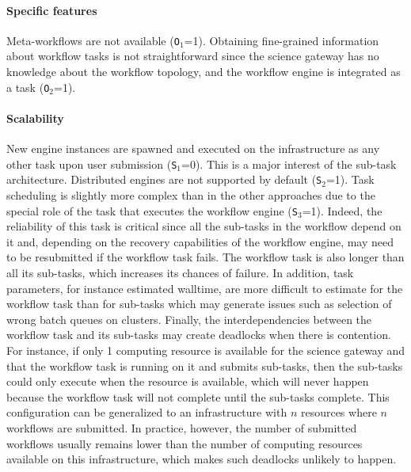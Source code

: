 \documentclass[preprint,3p,twocolumn]{elsarticle}
\newcommand{\todo}[2]{\pdfmargincomment[color=red,author=#1,open=true]{#2}}
\begin{document}
\paragraph{Specific features} Meta-workflows are not available
(\texttt{O$_1$}=1).  Obtaining fine-grained information about workflow
tasks is not straightforward since the science gateway has no
knowledge about the workflow topology, and the workflow engine is
integrated as a task (\texttt{O$_2$}=1).



\paragraph{Scalability}
New engine instances are spawned and executed on the infrastructure as
any other task upon user submission (\texttt{S$_1$}=0). This is a
major interest of the sub-task architecture. Distributed engines are
not supported by default (\texttt{S$_2$}=1). Task scheduling is
slightly more complex than in the other approaches due to the special
role of the task that executes the workflow engine
(\texttt{S$_3$}=1). Indeed, the reliability of this task is critical
since all the sub-tasks in the workflow depend on it and, depending on
the recovery capabilities of the workflow engine, may need to be
resubmitted if the workflow task fails. The workflow task is also
longer than all its sub-tasks, which increases its chances of
failure. In addition, task parameters, for instance estimated
walltime, are more difficult to estimate for the workflow task than
for sub-tasks which may generate issues such as selection of wrong
batch queues on clusters. Finally, the interdependencies between the
workflow task and its sub-tasks may create deadlocks when there is
contention. For instance, if only 1 computing resource is
available for the science gateway and that the workflow task is
running on it and submits sub-tasks, then the sub-tasks could only
execute when the resource is available, which will never happen
because the workflow task will not complete until the sub-tasks
complete. This configuration can be generalized to an infrastructure
with $n$ resources where $n$ workflows are submitted. In practice,
however, the number of submitted workflows usually remains lower than
the number of computing resources available on this infrastructure,
which makes such deadlocks unlikely to happen.
\end{document}
